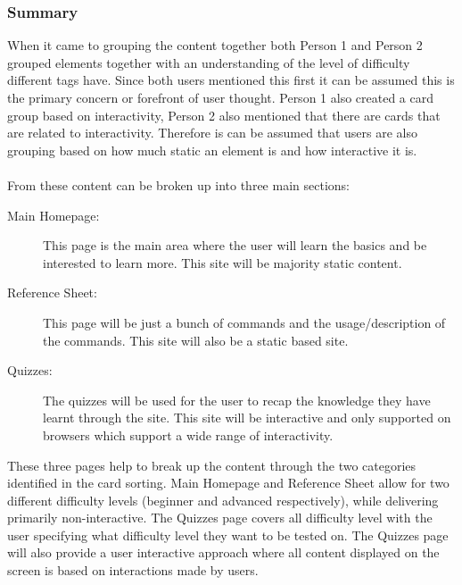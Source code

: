 \subsubsection{Summary}
When it came to grouping the content together both Person 1 and Person 2 grouped elements together with an understanding of the level of difficulty different tags have. Since both users mentioned this first it can be assumed this is the primary concern or forefront of user thought. Person 1 also created a card group based on interactivity, Person 2 also mentioned that there are cards that are related to interactivity. Therefore is can be assumed that users are also grouping based on how much static an element is and how interactive it is.\\\\
From these content can be broken up into three main sections:
\begin{description}
	\item[Main Homepage:] This page is the main area where the user will learn the basics and be interested to learn more. This site will be majority static content.
	\item[Reference Sheet:] This page will be just a bunch of commands and the usage/description of the commands. This site will also be a static based site.
	\item[Quizzes:] The quizzes will be used for the user to recap the knowledge they have learnt through the site. This site will be interactive and only supported on browsers which support a wide range of interactivity.
\end{description}\vspace{1em}
These three pages help to break up the content through the two categories identified in the card sorting. Main Homepage and Reference Sheet allow for two different difficulty levels (beginner and advanced respectively), while delivering primarily non-interactive. The Quizzes page covers all difficulty level with the user specifying what difficulty level they want to be tested on. The Quizzes page will also provide a user interactive approach where all content displayed on the screen is based on interactions made by users.


